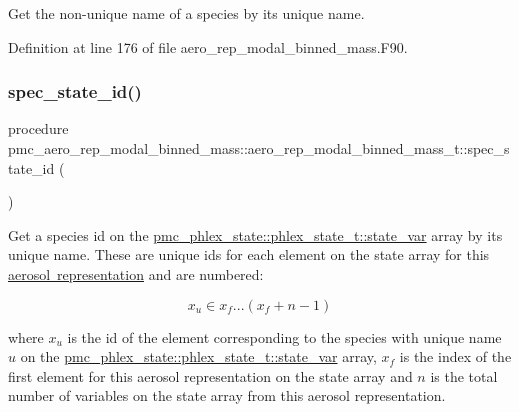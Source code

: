 Get the non-\/unique name of a species by its unique name. 



Definition at line 176 of file aero\+\_\+rep\+\_\+modal\+\_\+binned\+\_\+mass.\+F90.

\mbox{\label{structpmc__aero__rep__modal__binned__mass_1_1aero__rep__modal__binned__mass__t_aaa4d131524eb4c9f2bff96d8948caa4f}} 
\subsubsection{\texorpdfstring{spec\+\_\+state\+\_\+id()}{spec\_state\_id()}}
{\footnotesize\ttfamily procedure pmc\+\_\+aero\+\_\+rep\+\_\+modal\+\_\+binned\+\_\+mass\+::aero\+\_\+rep\+\_\+modal\+\_\+binned\+\_\+mass\+\_\+t\+::spec\+\_\+state\+\_\+id (\begin{DoxyParamCaption}{ }\end{DoxyParamCaption})\hspace{0.3cm}{\ttfamily [private]}}



Get a species id on the {\ttfamily \mbox{\hyperlink{structpmc__phlex__state_1_1phlex__state__t_a78835cb552d483ebbfc7a6bc6f756918}{pmc\+\_\+phlex\+\_\+state\+::phlex\+\_\+state\+\_\+t\+::state\+\_\+var}}} array by its unique name. These are unique ids for each element on the state array for this \mbox{\hyperlink{phlex_aero_rep}{aerosol representation}} and are numbered\+: 

\[x_u \in x_f ... (x_f+n-1)\]

where $x_u$ is the id of the element corresponding to the species with unique name $u$ on the {\ttfamily \mbox{\hyperlink{structpmc__phlex__state_1_1phlex__state__t_a78835cb552d483ebbfc7a6bc6f756918}{pmc\+\_\+phlex\+\_\+state\+::phlex\+\_\+state\+\_\+t\+::state\+\_\+var}}} array, $x_f$ is the index of the first element for this aerosol representation on the state array and $n$ is the total number of variables on the state array from this aerosol representation. 

